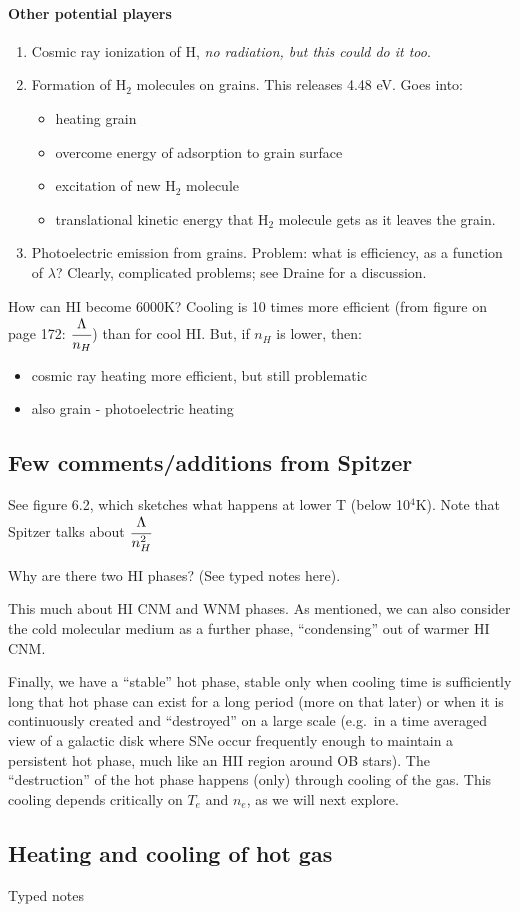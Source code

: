 \documentclass[11pt]{article}
\newcommand{\mar}[1]{\hspace{0pt}\marginpar{-\textcolor{black}{#1}-}}
\newcommand{\mynotes}[1]{{\fontfamily{cmss}\selectfont \textit{#1}}}
\begin{document}
\paragraph{Other potential players}
\begin{enumerate}[label=(\alph*)]
    \item Cosmic ray ionization of H, \mynotes{no radiation, but this
        could do it too}.
    \item Formation of H$_{2}$ molecules on grains.
        This releases 4.48 eV. Goes into:
        \begin{itemize}
            \item heating grain
            \item overcome energy of adsorption to grain surface
            \item excitation of new H$_{2}$ molecule
            \item translational kinetic energy that H$_{2}$ molecule
                gets as it leaves the grain.
        \end{itemize}
    \item Photoelectric emission from grains. Problem: what is efficiency, as a
        function of $\lambda$? Clearly, complicated problems; see
        Draine for a discussion.
\end{enumerate}
How can HI become 6000K? Cooling is 10 times more efficient
(from figure on page 172: $\cfrac{\Lambda}{n_{H}}$) than for cool HI.
But, if $n_{H}$ is lower, then:
\begin{itemize}
    \item cosmic ray heating more efficient, but still problematic
    \item also grain - photoelectric heating
\end{itemize}

\subsection{Few comments/additions from Spitzer}
See figure 6.2, which sketches what happens at lower T (below 10$^{4}$K).
Note that Spitzer talks about $\cfrac{\Lambda}{n_{H}^{2}}$

\mar{166}Why are there two HI phases?
(See typed notes here).

\mar{167}This much about HI CNM and WNM phases. As mentioned, we can also
consider the cold molecular medium as a further phase, ``condensing'' out of
warmer HI CNM.

Finally, we have a ``stable'' hot phase, stable only when cooling time is
sufficiently long that hot phase can exist for a long period (more on that
later) or when it is continuously created and ``destroyed'' on a large scale
(e.g.\ in a time averaged view of a galactic disk where SNe occur frequently
enough to maintain a persistent hot phase, much like an HII region around OB
stars). The ``destruction'' of the hot phase happens (only) through cooling of
the gas. This cooling depends critically on $T_{e}$ and $n_{e}$, as we will
next explore.

\subsection{Heating and cooling of hot gas}
\mar{168}Typed notes
\hspace{0pt}\marginpar{\textcolor{black}{\ldots}}
\mar{172}
\end{document}
